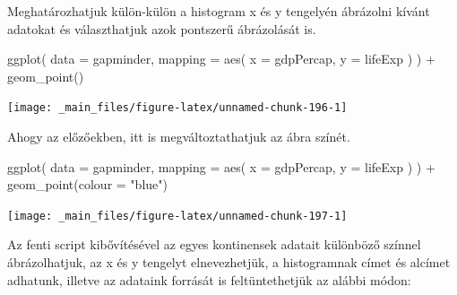 \documentclass[
]{book}
\newenvironment{Shaded}{\begin{snugshade}}{\end{snugshade}}
\newcommand{\AttributeTok}[1]{\textcolor[rgb]{0.77,0.63,0.00}{#1}}
\newcommand{\FunctionTok}[1]{\textcolor[rgb]{0.00,0.00,0.00}{#1}}
\newcommand{\NormalTok}[1]{#1}
\newcommand{\SpecialCharTok}[1]{\textcolor[rgb]{0.00,0.00,0.00}{#1}}
\newcommand{\StringTok}[1]{\textcolor[rgb]{0.31,0.60,0.02}{#1}}
\begin{document}
Meghatározhatjuk külön-külön a histogram x és y tengelyén ábrázolni
kívánt adatokat és választhatjuk azok pontszerű ábrázolását is.

\begin{Shaded}
\begin{Highlighting}[]
\FunctionTok{ggplot}\NormalTok{(}
  \AttributeTok{data =}\NormalTok{ gapminder,}
  \AttributeTok{mapping =} \FunctionTok{aes}\NormalTok{(}
    \AttributeTok{x =}\NormalTok{ gdpPercap,}
    \AttributeTok{y =}\NormalTok{ lifeExp}
\NormalTok{  )}
\NormalTok{) }\SpecialCharTok{+}
  \FunctionTok{geom\_point}\NormalTok{() }
\end{Highlighting}
\end{Shaded}

\begin{center}\texttt{[image: \_main\_files/figure-latex/unnamed-chunk-196-1]} \end{center}

Ahogy az előzőekben, itt is megváltoztathatjuk az ábra színét.

\begin{Shaded}
\begin{Highlighting}[]
\FunctionTok{ggplot}\NormalTok{(}
  \AttributeTok{data =}\NormalTok{ gapminder,}
  \AttributeTok{mapping =} \FunctionTok{aes}\NormalTok{(}
    \AttributeTok{x =}\NormalTok{ gdpPercap,}
    \AttributeTok{y =}\NormalTok{ lifeExp}
\NormalTok{  )}
\NormalTok{) }\SpecialCharTok{+}
  \FunctionTok{geom\_point}\NormalTok{(}\AttributeTok{colour =} \StringTok{"blue"}\NormalTok{)}
\end{Highlighting}
\end{Shaded}

\begin{center}\texttt{[image: \_main\_files/figure-latex/unnamed-chunk-197-1]} \end{center}

Az fenti script kibővítésével az egyes kontinensek adatait különböző
színnel ábrázolhatjuk, az x és y tengelyt elnevezhetjük, a histogramnak
címet és alcímet adhatunk, illetve az adataink forrását is
feltüntethetjük az alábbi módon:

\begin{Shaded}
\end{Shaded}
\end{document}
